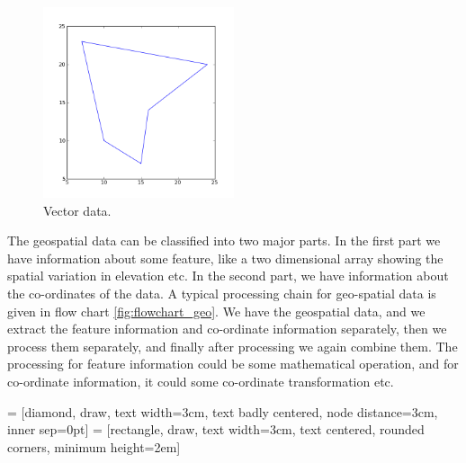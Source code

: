 \documentclass[10pt]{book}
\begin{document}
{\beforefig
\begin{figure}[h!]
  \centering
    \includegraphics[width=0.5\textwidth]{images/vect.png}
  \caption{Vector data.}
   \label{fig:vect}
\end{figure}
\afterfig

The geospatial data can be classified into two major parts. In the first part we have information about some feature, like a two dimensional array showing the spatial variation in elevation etc. In the second part, we have information about the co-ordinates of the data. A typical processing chain for geo-spatial data is given in flow chart \ref{fig:flowchart_geo}. We have the geospatial data, and we extract the feature information and co-ordinate information separately, then we process them separately, and finally after processing we again combine them. The processing for feature information could be some mathematical operation, and for co-ordinate information, it could some co-ordinate transformation etc.

 = [diamond, draw, text width=3cm, text badly centered, node distance=3cm, inner sep=0pt]
 = [rectangle, draw, text width=3cm, text centered, rounded corners, minimum height=2em]
\begin{figure}[h]
 \begin{center}
\end{center}
\end{figure}}
\end{document}
